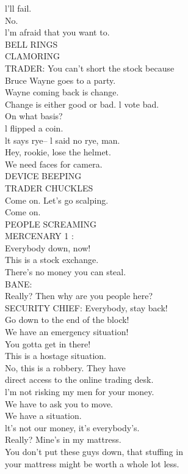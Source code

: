 \documentclass{article}
\begin{document}
\begin{multicols}{3}
l'll fail.\\
No.\\
l'm afraid that you want to.\\
BELL RINGS\\
CLAMORING\\
TRADER: You can't short the stock because\\
Bruce Wayne goes to a party.\\
Wayne coming back is change.\\
Change is either good or bad. l vote bad.\\
On what basis?\\
l flipped a coin.\\
lt says rye-- l said no rye, man.\\
Hey, rookie, lose the helmet.\\
We need faces for camera.\\
DEVICE BEEPING\\
TRADER CHUCKLES\\
Come on. Let's go scalping.\\
Come on.\\
PEOPLE SCREAMING\\
MERCENARY 1 :\\
Everybody down, now!\\
This is a stock exchange.\\
There's no money you can steal.\\
BANE:\\
Really? Then why are you people here?\\
SECURITY CHIEF: Everybody, stay back!\\
Go down to the end of the block!\\
We have an emergency situation!\\
You gotta get in there!\\
This is a hostage situation.\\
No, this is a robbery. They have\\
direct access to the online trading desk.\\
l'm not risking my men for your money.\\
We have to ask you to move.\\
We have a situation.\\
lt's not our money, it's everybody's.\\
Really? Mine's in my mattress.\\
You don't put these guys down, that stuffing in\\
your mattress might be worth a whole lot less.\\

\end{multicols}
\end{document}
